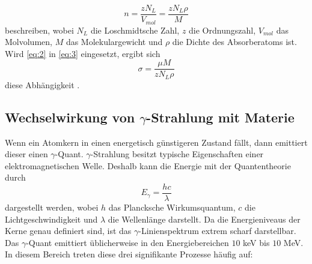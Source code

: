 \begin{equation}
  n= \frac{z N_{L}}{V_{mol}}= \frac{z N_{L} \rho}{M}
  \label{eq:3}
\end{equation}
beschreiben, wobei $N_{L}$ die Loschmidtsche Zahl, $z$ die Ordnungszahl, $V_{mol}$ das Molvolumen, $M$ das Molekulargewicht und $\rho$ die Dichte des Absorberatoms ist. Wird \eqref{eq:2} in \eqref{eq:3} eingesetzt, ergibt sich 
\begin{equation}
  \sigma=\frac{\mu M}{z N_{L}\rho}
  \label{eq:4}
\end{equation}
diese Abhängigkeit \cite{sample}.

\subsection{Wechselwirkung von $\gamma$-Strahlung mit Materie}
Wenn ein Atomkern in einen energetisch günstigeren Zustand fällt, dann emittiert dieser einen $\gamma$-Quant. $\gamma$-Strahlung besitzt typische Eigenschaften einer elektromagnetischen Welle. Deshalb kann die Energie mit der Quantentheorie durch
\begin{equation*}
  E_{\gamma}=\frac{hc}{\lambda}
\end{equation*}
dargestellt werden, wobei $h$ das Plancksche Wirkumsquantum, $c$ die Lichtgeschwindigkeit und $\lambda$ die Wellenlänge darstellt. Da die Energieniveaus der Kerne genau definiert sind, ist das $\gamma$-Linienspektrum extrem scharf darstellbar. \\
Das $\gamma$-Quant emittiert üblicherweise in den Energiebereichen $10$ keV bis $10$ MeV. In diesem Bereich treten diese drei signifikante Prozesse häufig auf:
